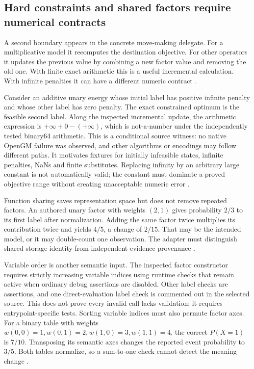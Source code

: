 \subsection{Hard constraints and shared factors require numerical contracts}
A second boundary appears in the concrete move-making delegate. For a
multiplicative model it recomputes the destination objective. For other
operators it updates the previous value by combining a new factor value
and removing the old one. With finite exact arithmetic this is a useful
incremental calculation. With infinite penalties it can have a different
numeric contract \cite{exec24_opengm_source}.

Consider an additive unary energy whose initial label has positive infinite
penalty and whose other label has zero penalty. The exact constrained
optimum is the feasible second label. Along the inspected incremental
update, the arithmetic expression is $+\infty+0-(+\infty)$, which is
not-a-number under the independently tested binary64 arithmetic. This is a
conditional source witness: no native OpenGM failure was observed, and
other algorithms or encodings may follow different paths. It motivates
fixtures for initially infeasible states, infinite penalties, NaNs and
finite substitutes. Replacing infinity by an arbitrary large constant is
not automatically valid; the constant must dominate a proved objective
range without creating unacceptable numeric error
\cite{exec24_opengm_source,exec24_opengm_choice}.

Function sharing saves representation space but does not remove repeated
factors. An authored unary factor with weights $(2,1)$ gives probability
$2/3$ to its first label after normalization. Adding the same factor twice
multiplies its contribution twice and yields $4/5$, a change of $2/15$.
That may be the intended model, or it may double-count one observation.
The adapter must distinguish shared storage identity from independent
evidence provenance \cite{exec24_opengm_paper,exec24_opengm_choice}.

Variable order is another semantic input. The inspected factor constructor
requires strictly increasing variable indices using runtime checks that
remain active when ordinary debug assertions are disabled. Other label
checks are assertions, and one direct-evaluation label check is commented
out in the selected source. This does not prove every invalid call lacks
validation; it requires entrypoint-specific tests. Sorting variable indices
must also permute factor axes. For a binary table with weights
$w(0,0)=1,w(0,1)=2,w(1,0)=3,w(1,1)=4$, the correct $P(X=1)$ is $7/10$.
Transposing its semantic axes changes the reported event probability to
$3/5$. Both tables normalize, so a sum-to-one check cannot detect the
meaning change \cite{exec24_opengm_source,exec24_opengm_choice}.

